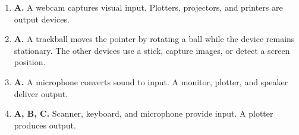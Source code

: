 \begin{enumerate}[label=\textbf{Q\arabic*.}, leftmargin=*]
\item \textbf{A.} A webcam captures visual input. Plotters, projectors, and printers are output devices.

\item \textbf{A.} A trackball moves the pointer by rotating a ball while the device remains stationary. The other devices use a stick, capture images, or detect a screen position.

\item \textbf{A.} A microphone converts sound to input. A monitor, plotter, and speaker deliver output.

\item \textbf{A, B, C.} Scanner, keyboard, and microphone provide input. A plotter produces output.

\end{enumerate}

